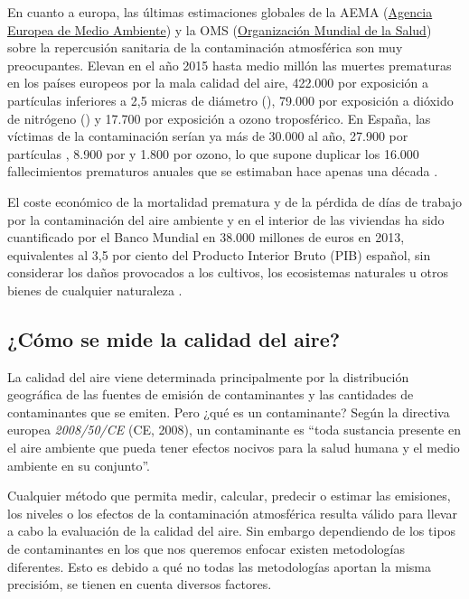 En cuanto a europa, las últimas estimaciones globales de la AEMA (\href{https://www.eea.europa.eu/}{Agencia Europea de Medio Ambiente}) y la OMS (\href{https://www.who.int/}{Organización Mundial de la Salud}) sobre la repercusión sanitaria de la contaminación atmosférica son muy preocupantes. Elevan en el año 2015 hasta medio millón las muertes prematuras en los países europeos por la mala calidad del aire, 422.000 por exposición a partículas inferiores a 2,5 micras de diámetro (), 79.000 por exposición a dióxido de nitrógeno () y 17.700 por exposición a ozono troposférico. En España, las víctimas de la contaminación serían ya más de 30.000 al año, 27.900 por partículas , 8.900 por  y 1.800 por ozono, lo que supone duplicar los 16.000 fallecimientos prematuros anuales que se estimaban hace apenas una década \cite{informe_ecologistas}.

El coste económico de la mortalidad prematura y de la pérdida de días de trabajo por la contaminación del aire ambiente y en el interior de las viviendas ha sido cuantificado por el Banco Mundial en 38.000 millones de euros en 2013, equivalentes al 3,5 por ciento del Producto Interior Bruto (PIB) español, sin considerar los daños provocados a los cultivos, los ecosistemas naturales u otros bienes de cualquier naturaleza  \cite{informe_ecologistas}.



 \subsection{¿Cómo se mide la calidad del aire?}
 
 La calidad del aire viene determinada principalmente por la distribución geográfica de las fuentes de emisión de contaminantes y las cantidades de contaminantes que se emiten. Pero ¿qué es un contaminante? Según la directiva europea \textit{2008/50/CE} (CE, 2008), un contaminante es “toda sustancia presente en el aire ambiente que pueda tener efectos nocivos para la salud humana y el medio ambiente en su conjunto”. 
 
 Cualquier método que permita medir, calcular, predecir o estimar las emisiones, los niveles o los efectos de la contaminación atmosférica resulta válido para llevar a cabo la evaluación de la calidad del aire. Sin embargo dependiendo de los tipos de contaminantes en los que nos queremos enfocar existen metodologías diferentes. Esto es debido a qué no todas las metodologías aportan la misma precisióm, se tienen en cuenta diversos factores.
 
